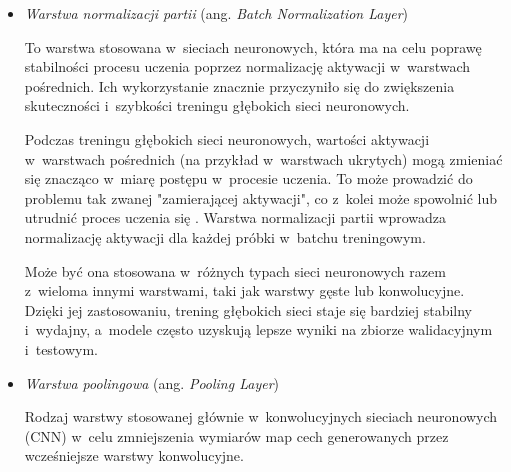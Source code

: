 {\begin{itemize}
        Jest to konkretny implementacja z~grupy warstw rekurencyjnych stosowana w~sieciach neuronowych do analizy sekwencji danych.
        Została zaprojektowana, aby radzić sobie z~problemem zanikającego gradientu pojawiającego się w~warstwach rekurencyjnych i~umożliwiać modelom przechowywanie i~wykorzystywanie informacji długoterminowej w~danych sekwencyjnych.

        Tak jak inne warstwy rekurencyjne, warstwa \emph{LSTM} jest skutecznym narzędziem w~analizie sekwencji danych, takich jak język naturalny czy dane czasowe, ponieważ jest w~stanie przechowywać informacje na dłuższe okresy i~uwzględniać zależności na różnych odległościach czasowych.
        Dzięki mechanizmom bramkowym, \emph{LSTM} może nauczyć się wybierać, które informacje są ważne i~które powinny zostać pominięte w~analizie sekwencji, co czyni ją jedną z~kluczowych innowacji w~dziedzinie rekurencyjnych sieci neuronowych \cite{staudemeyer2019understanding}.

  \item \emph{Warstwa normalizacji partii} (ang. \emph{Batch Normalization Layer})

        To warstwa stosowana w~sieciach neuronowych, która ma na celu poprawę stabilności procesu uczenia poprzez normalizację aktywacji w~warstwach pośrednich.
        Ich wykorzystanie znacznie przyczyniło się do zwiększenia skuteczności i~szybkości treningu głębokich sieci neuronowych.

        Podczas treningu głębokich sieci neuronowych, wartości aktywacji w~warstwach pośrednich (na przykład w~warstwach ukrytych) mogą zmieniać się znacząco w~miarę postępu w~procesie uczenia.
        To może prowadzić do problemu tak zwanej "zamierającej aktywacji", co z~kolei może spowolnić lub utrudnić proces uczenia się \cite{bjorck2018understanding}.
        Warstwa normalizacji partii wprowadza normalizację aktywacji dla każdej próbki w~batchu treningowym.

        Może być ona stosowana w~różnych typach sieci neuronowych razem z~wieloma innymi warstwami, taki jak warstwy gęste lub konwolucyjne.
        Dzięki jej zastosowaniu, trening głębokich sieci staje się bardziej stabilny i~wydajny, a~modele często uzyskują lepsze wyniki na zbiorze walidacyjnym i~testowym.

  \item \emph{Warstwa poolingowa} (ang. \emph{Pooling Layer})

        Rodzaj warstwy stosowanej głównie w~konwolucyjnych sieciach neuronowych (CNN) w~celu zmniejszenia wymiarów map cech generowanych przez wcześniejsze warstwy konwolucyjne.


\end{itemize}}
